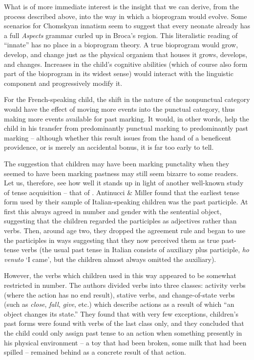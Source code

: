 What is of more immediate interest is the insight that we can derive, from the process described above, into the way in which a bioprogram would evolve. Some scenarios for Chomskyan innatism seem to suggest that every neonate already has a full \textit{Aspects} grammar curled
up in Broca's region. This literalistic reading of ``innate'' has no place in a bioprogram theory. A true bioprogram would grow, develop, and change just as the physical organism that houses it grows, develops, and changes. Increases in the child's cognitive abilities (which of course also form part of the bioprogram in its widest sense) would interact with the linguistic component and progressively modify it.

For the French-speaking child, the shift in the nature of the nonpunctual category would have the effect of moving more events into the punctual category, thus making more events available for past marking. It would, in other words, help the child in his transfer from predominantly punctual marking to predominantly past marking -- although whether this result issues from the hand of a beneficent providence, or is merely an accidental bonus, it is far too early to tell.

The suggestion that children may have been marking punctality when they seemed to have been marking pastness may still seem bizarre to some readers. Let us, therefore, see how well it stands up in light of another well-known study of tense acquisition -- that of \citet{AntinucciEtAl1976}.
Antinucci \& Miller found that the earliest tense form used by their sample of Italian-speaking children was the past participle. At first this always agreed in number and gender with the sentential object, suggesting that the children regarded the participles as adjectives rather than verbs. Then, around age two, they dropped the agreement rule and began to use the participles in ways suggesting that they now perceived them as true past-tense verbs (the usual past tense in Italian consists of auxiliary plus participle, \textit{ho venuto} `I came', but the children almost always omitted the auxiliary).

However, the verbs which children used in this way appeared to be somewhat restricted in number. The authors divided verbs into three classes: activity verbs (where the action has no end result), stative verbs, and change-of-state verbs (such as \textit{close}, \textit{fall}, \textit{give}, etc.) which describe actions as a result of which ``an object changes its state.'' They found that with very few exceptions, children's past
forms were found with verbs of the last class only, and they concluded that the child could only assign past tense to an action when some\-thing presently in his physical environment -- a toy that had been broken, some milk that had been spilled -- remained behind as a concrete result of that action.

